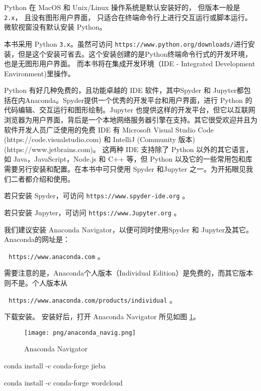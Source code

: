 \documentclass[main.tex]{subfiles}
\begin{document}
Python 在 MacOS 和 Unix/Linux 操作系统是默认安装好的，
但版本一般是 \texttt{2.x}，
且没有图形用户界面，
只适合在终端命令行上进行交互运行或脚本运行。
微软视窗没有默认安装 Python。

本书采用 Python \texttt{3.x}。虽然可访问 \texttt{https://www.python.org/downloads/}进行安装，但是这个安装可省去。这个安装创建的是Python终端命令行式的开发环境，也是无图形用户界面。
而本书将在集成开发环境（IDE - Integrated Development Environment)里操作。

Python 有好几种免费的，且功能卓越的 IDE 软件，其中Spyder 和 Jupyter都包括在内Anaconda。Spyder提供一个优秀的开发平台和用户界面，进行 Python 的代码编辑、交互运行和图形绘制。Jupyter 也提供这样的开发平台，但它以互联网浏览器为用户界面，背后是一个本地网络服务器引擎在支持。其它很受欢迎并且为软件开发人员广泛使用的免费 IDE 有 Microsoft Visual Studio Code (https://code.visualstudio.com) 和 IntelliJ (Community 版本) (https://www.jetbrains.com)。
这两种 IDE 支持除了 Python 以外的其它语言，如 Java，JavaScript，Node.js 和 C++ 等，但 Python 以及它的一些常用包和库需要另行安装和配置。在本书中可只使用 Spyder 和Jupyter 之一。为开拓眼见我们二者都介绍和使用。  


若只安装 Spyder，可访问
\texttt{https://www.spyder-ide.org} 。

若只安装 Jupyter，可访问
\texttt{https://www.Jupyter.org} 。

我们建议安装 Anaconda Navigator，以便可同时使用Spyder 和 Jupyter及其它。 Anaconda的网址是：

\,\,\,\,\texttt{https://www.anaconda.com} 。

\noindent 需要注意的是，Anaconda个人版本（Individual Edition）是免费的，而其它版本则不是。个人版本从

\,\,\,\,\texttt{https://www.anaconda.com/products/individual} 。

\noindent 下载安装。
安装好后，打开 Anaconda Navigator 所见如图 \ref{fig:2.1.1}。

\begin{figure}[h]
	\texttt{[image: png/anaconda\_navig.png]}
	\caption{Anaconda Navigator}\label{fig:2.1.1}
\end{figure}


conda install -c conda-forge jieba 

conda install -c conda-forge wordcloud
\end{document}
